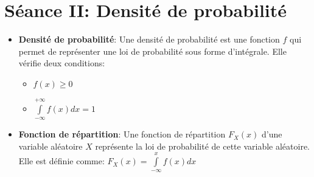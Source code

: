 \documentclass[a4paper,11pt]{report}
\begin{document}
\section{Séance II: Densité de probabilité}
\begin{itemize}
	\item \textbf{Densité de probabilité}: Une densité de probabilité est une fonction $f$ qui permet de représenter une loi de probabilité sous forme d'intégrale. Elle vérifie deux conditions:
	\begin{itemize}
		\item $f(x) \ge 0$
		\item $\int\limits_{-\infty}^{+\infty}{f(x)dx}=1$
	\end{itemize}
	\item \textbf{Fonction de répartition}: Une fonction de répartition $F_X(x)$ d'une variable aléatoire $X$ représente la loi de probabilité de cette variable aléatoire. Elle est définie comme: $F_X(x)=\int\limits_{-\infty}^{x}{f(x)dx}$
\end{itemize}

\end{document}
